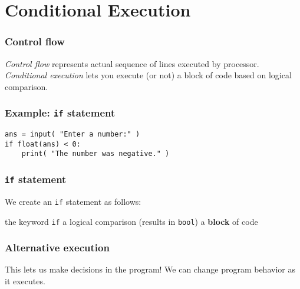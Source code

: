 \documentclass[11pt]{beamer}
\begin{document}
\section{Conditional Execution}

\begin{frame}[fragile]
  \frametitle{Control flow}
  \Enlarge

  \begin{itemize}
  \myitem  \emph{Control flow} represents actual sequence of lines executed by processor. %
  \myitem  \emph{Conditional execution} lets you execute (or not) a block of code based on logical comparison.
  \end{itemize}
\end{frame}

\begin{frame}[fragile]
  \frametitle{Example:  \texttt{if} statement}
  \Enlarge

  \begin{Verbatim}[commandchars=\\\{\},commentchar=\%]
ans = input( "Enter a number:" )
if float(ans) < 0:
    print( "The number was negative." )
  \end{Verbatim}
\end{frame}

\begin{frame}[fragile]
  \frametitle{\texttt{if} statement}
  \Enlarge

  \begin{itemize}
  \myitem  We create an \texttt{if} statement as follows:
    \begin{itemize}
    \mysubitem  the keyword \texttt{if}
    \mysubitem  a logical comparison (results in \texttt{bool})
    \mysubitem  a \textbf{block} of code
    \end{itemize}
  \end{itemize}
\end{frame}

\begin{frame}[fragile]
  \frametitle{Alternative execution}
  \Enlarge

  \begin{itemize}
  \myitem  This lets us make decisions in the program! %
  \myitem  We can change program behavior as it executes.
  \end{itemize}
\end{frame}
\end{document}
